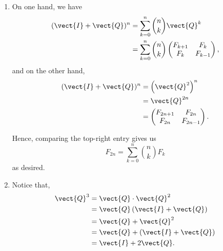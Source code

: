 \begin{enumerate}
          \begin{enumerate}
              \item On one hand, we have
                    \begin{align*}
                        (\vect{I} + \vect{Q})^n & = \sum_{k = 0}^{n} \binom{n}{k} \vect{Q}^{k}                      \\
                                                & = \sum_{k = 0}^{n} \binom{n}{k} \begin{pmatrix}
                                                                                      F_{k + 1} & F_k \\ F_k & F_{k - 1}
                                                                                  \end{pmatrix},
                    \end{align*}
                    and on the other hand,
                    \begin{align*}
                        (\vect{I} + \vect{Q})^n & = \left(\vect{Q}^2\right)^n                 \\
                                                & = \vect{Q}^{2n}                             \\
                                                & = \begin{pmatrix}
                                                        F_{2n + 1} & F_{2n} \\ F_{2n} & F_{2n - 1}
                                                    \end{pmatrix}.
                    \end{align*}

                    Hence, comparing the top-right entry gives us
                    \[
                        F_{2n} = \sum_{k = 0}^{n} \binom{n}{k} F_k
                    \]
                    as desired.

              \item Notice that,
                    \begin{align*}
                        \vect{Q}^3 & = \vect{Q} \cdot \vect{Q}^2                   \\
                                   & = \vect{Q} \left(\vect{I} + \vect{Q}\right)   \\
                                   & = \vect{Q} + \vect{Q}^2                       \\
                                   & = \vect{Q} + \left(\vect{I} + \vect{Q}\right) \\
                                   & = \vect{I} + 2 \vect{Q}.
                    \end{align*}


\end{enumerate}
\end{enumerate}
